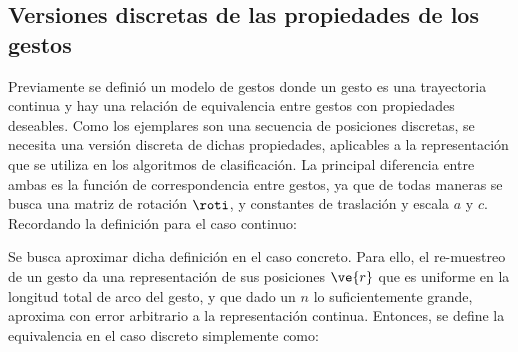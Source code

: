 




\subsection{Versiones discretas de las propiedades de los gestos}

Previamente se definió un modelo de gestos donde un gesto es una trayectoria continua y hay una relación de equivalencia entre gestos con propiedades deseables. Como los ejemplares son una secuencia de posiciones discretas, se necesita una versión discreta de dichas propiedades, aplicables a la representación que se utiliza en los algoritmos de clasificación. La principal diferencia entre ambas es la función de correspondencia entre gestos, ya que de todas maneras se busca una matriz de rotación $\roti$, y constantes de traslación y escala $a$ y $c$. Recordando la definición para el caso continuo:



Se busca aproximar dicha definición en el caso concreto. Para ello, el re-muestreo de un gesto da una representación de sus posiciones $\ve{r}$ que es uniforme en la longitud total de arco del gesto, y que dado un $n$ lo suficientemente grande, aproxima con error arbitrario a la representación continua.  Entonces, se define la equivalencia en el caso discreto simplemente como:

